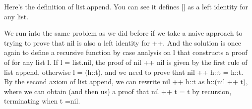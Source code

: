 \documentclass[letterpaper,10pt,english]{sphinxmanual}
\begin{document}
\sphinxAtStartPar
Here’s the definition of list.append.
You can see it defines {[}{]} as a left identity for any list.

\begin{sphinxVerbatim}[commandchars=\\\{\}]
\PYG{c+cm}{[}\PYG{c+cm}{]}


                
 
 \PYG{o}{[}\PYG{o}{]}
\end{sphinxVerbatim}

\sphinxAtStartPar
We run into the same problem as we did before if we take a
naive approach to trying to prove that nil is also a left
identity for ++. And the solution is once again to define
a recursive function by case analysis on l that constructs
a proof of  for any list l. If l = list.nil,
the proof of nil ++ nil is given by the first rule of list
append, otherwise l = (h::t), and we need to prove that
nil ++ h::t = h::t. By the second axiom of list append,
we can rewrite nil ++ h::t as h::(nil ++ t), where we can
obtain (and then us) a proof that nil ++ t = t by recursion,
terminating when t =nil.
\end{document}
